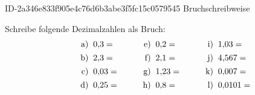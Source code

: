\begin{exercise}
      {ID-2a346e833f905e4c76d6b3abe3f5fc15c0579545}
      {Bruchschreibweise}
  \ifproblem\problem\par
    Schreibe folgende Dezimalzahlen als Bruch:
    \newcommand{\no}[1]
    {%
      \vphantom{\big(}%
      \makebox[3em][r]%
      {%
        #1)%
      }%
      \;\;&%
    }%
    \begin{align*}
      \no{a} 0,\!3=  & \no{e} 0,\!2=  & \no{i} 1,\!03=  \\
      \no{b} 2,\!3=  & \no{f} 2,\!1=  & \no{j} 4,\!567= \\
      \no{c} 0,\!03= & \no{g} 1,\!23= & \no{k} 0,\!007= \\
      \no{d} 0,\!25= & \no{h} 0,\!8=  & \no{l} 0,\!0101=
    \end{align*}
  \fi
\end{exercise}
